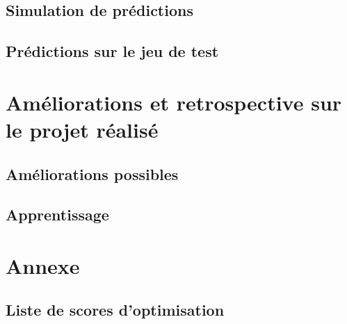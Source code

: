 \documentclass{article}
\numberwithin{equation}{section}
\begin{document}
\subsection{Simulation de prédictions}


\subsection{Prédictions sur le jeu de test}


\section{Améliorations et retrospective sur le projet réalisé}
\subsection{Améliorations possibles}


\subsection{Apprentissage}



\section{Annexe}
\subsection{Liste de scores d'optimisation}

\end{document}
